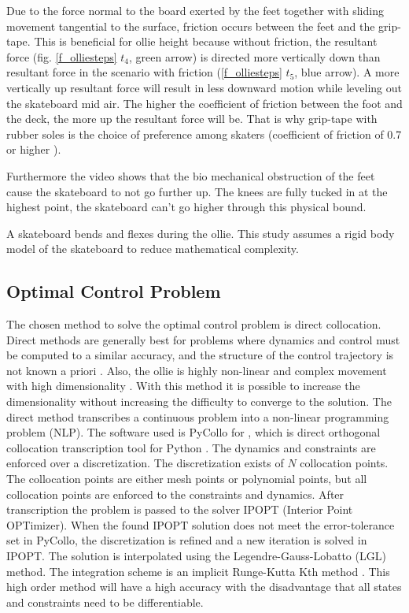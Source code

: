 \documentclass[default,iicol]{sn-jnl}
\theoremstyle{thmstyleone}%
\theoremstyle{thmstyletwo}%
\theoremstyle{thmstylethree}%
\begin{document}
Due to the force normal to the board exerted by the feet together with sliding movement tangential to the surface, friction occurs between the feet and the grip-tape. This is beneficial for ollie height because without friction, the resultant force (fig. \ref{f_olliesteps} $t_4$, green arrow) is directed more vertically down than resultant force in the scenario with friction (\ref{f_olliesteps} $t_5$, blue arrow). A more vertically up resultant force will result in less downward motion while leveling out the skateboard mid air. The higher the coefficient of friction between the foot and the deck, the more up the resultant force will be. That is why grip-tape with rubber soles is the choice of preference among skaters (coefficient of friction of 0.7 or higher \cite{bron_nog_nodate}). 

Furthermore the video shows that the bio mechanical obstruction of the feet cause the skateboard to not go further up. The knees are fully tucked in at the highest point, the skateboard can't go higher through this physical bound. 

A skateboard bends and flexes during the ollie. This study assumes a rigid body model of the skateboard to reduce mathematical complexity.

\subsection{Optimal Control Problem}
The chosen method to solve the optimal control problem is direct collocation. Direct methods are generally best for problems where dynamics and control must be computed to a similar accuracy, and the structure of the control trajectory is not known a priori \cite{kelly_introduction_2017}. Also, the ollie is highly non-linear and complex movement with high dimensionality . With this method it is possible to increase the dimensionality without increasing the difficulty to converge to the solution. The direct method transcribes a continuous problem into a non-linear programming problem (NLP). The software used is PyCollo for , which is direct orthogonal collocation transcription tool for Python \cite{brockie_predictive_nodate}. The dynamics and constraints are enforced over a discretization. The discretization exists of $N$ collocation points. The collocation points are either mesh points or polynomial points, but all collocation points are enforced to the constraints and dynamics. After transcription the problem is passed to the solver IPOPT (Interior Point OPTimizer). When the found IPOPT solution does not meet the error-tolerance set in PyCollo, the discretization is refined and a new iteration is solved in IPOPT. The solution is interpolated using the Legendre-Gauss-Lobatto (LGL) method. The integration scheme is an implicit Runge-Kutta Kth method \cite{brockie_predictive_nodate}. This high order method will have a high accuracy with the disadvantage that all states and constraints need to be differentiable.
\end{document}

